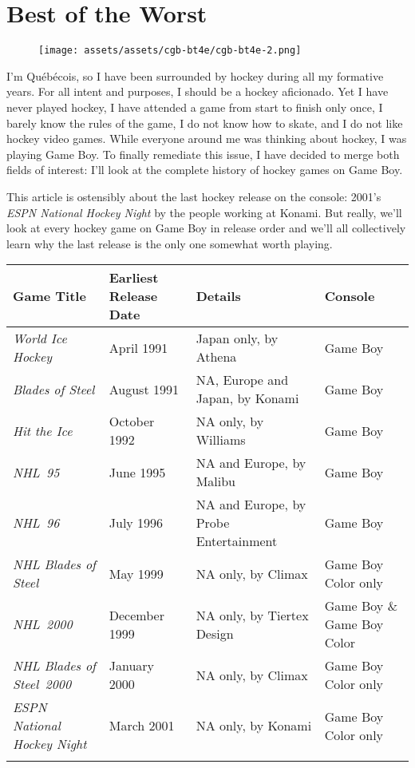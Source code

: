 \documentclass{book}
\let\oldcenter\center
\let\oldendcenter\endcenter
\renewenvironment{center}{\setlength\topsep{0pt}\oldcenter}{\oldendcenter}
\begin{document}
\newpage\FloatBarrier\needspace{10mm}\section*{Best of the Worst}\nopagebreak[4]
\begin{wrapfigure}{L}{0pt} \texttt{[image: assets/assets/cgb-bt4e/cgb-bt4e-2.png]}\end{wrapfigure}
I’m Québécois, so I have been surrounded by hockey during all my formative years. For all intent and purposes, I should be a hockey aficionado. Yet I have never played hockey, I have attended a game from start to finish only once, I barely know the rules of the game, I do not know how to skate, and I do not like hockey video games. While everyone around me was thinking about hockey, I was playing Game Boy. To finally remediate this issue, I have decided to merge both fields of interest: I’ll look at the complete history of hockey games on Game Boy.

This article is ostensibly about the last hockey release on the console: 2001’s \emph{ESPN National Hockey Night} by the people working at Konami. But really, we’ll look at every hockey game on Game Boy in release order and we’ll all collectively learn why the last release is the only one somewhat worth playing.

\begin{center} \footnotesize\begin{tabulary}{\textwidth}{LLLL} \hline
\textbf{Game Title} & \textbf{Earliest Release Date} & \textbf{Details} & \textbf{Console} \\
\hline
\emph{World Ice Hockey} & April 1991 & Japan only, by Athena & Game Boy \\
\hline
\emph{Blades of Steel} & August 1991 & NA, Europe and Japan, by Konami & Game Boy \\
\hline
\emph{Hit the Ice} & October 1992 & NA only, by Williams & Game Boy \\
\hline
\emph{NHL~95} & June 1995 & NA and Europe, by Malibu & Game Boy \\
\hline
\emph{NHL~96} & July 1996 & NA and Europe, by Probe Entertainment & Game Boy \\
\hline
\emph{NHL Blades of Steel} & May 1999 & NA only, by Climax & Game Boy Color only \\
\hline
\emph{NHL~2000} & December 1999 & NA only, by Tiertex Design & Game Boy \& Game Boy Color \\
\hline
\emph{NHL Blades of Steel~2000} & January 2000 & NA only, by Climax & Game Boy Color only \\
\hline
\emph{ESPN National Hockey Night} & March 2001 & NA only, by Konami & Game Boy Color only \\
\hline \normalsize\end{tabulary} \end{center}
\end{document}
